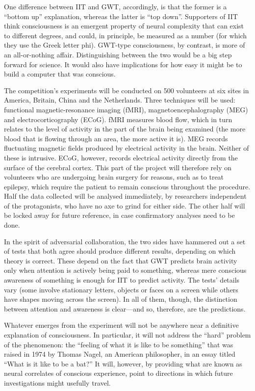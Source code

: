 \documentclass[
]{book}
\begin{document}
One difference between IIT and GWT, accordingly, is that the former is a ``bottom up'' explanation, whereas the latter is ``top down''. Supporters of IIT think consciousness is an emergent property of neural complexity that can exist to different degrees, and could, in principle, be measured as a number (for which they use the Greek letter phi). GWT-type consciousness, by contrast, is more of an all-or-nothing affair. Distinguishing between the two would be a big step forward for science. It would also have implications for how easy it might be to build a computer that was conscious.

The competition's experiments will be conducted on 500 volunteers at six sites in America, Britain, China and the Netherlands. Three techniques will be used: functional magnetic-resonance imaging (fMRI), magnetoencephalography (MEG) and electrocorticography (ECoG). fMRI measures blood flow, which in turn relates to the level of activity in the part of the brain being examined (the more blood that is flowing through an area, the more active it is). MEG records fluctuating magnetic fields produced by electrical activity in the brain. Neither of these is intrusive. ECoG, however, records electrical activity directly from the surface of the cerebral cortex. This part of the project will therefore rely on volunteers who are undergoing brain surgery for reasons, such as to treat epilepsy, which require the patient to remain conscious throughout the procedure. Half the data collected will be analysed immediately, by researchers independent of the protagonists, who have no axe to grind for either side. The other half will be locked away for future reference, in case confirmatory analyses need to be done.

In the spirit of adversarial collaboration, the two sides have hammered out a set of tests that both agree should produce different results, depending on which theory is correct. These depend on the fact that GWT predicts brain activity only when attention is actively being paid to something, whereas mere conscious awareness of something is enough for IIT to predict activity. The tests' details vary (some involve stationary letters, objects or faces on a screen while others have shapes moving across the screen). In all of them, though, the distinction between attention and awareness is clear---and so, therefore, are the predictions.

Whatever emerges from the experiment will not be anywhere near a definitive explanation of consciousness. In particular, it will not address the ``hard'' problem of the phenomenon: the ``feeling of what it is like to be something'' that was raised in 1974 by Thomas Nagel, an American philosopher, in an essay titled ``What is it like to be a bat?'' It will, however, by providing what are known as neural correlates of conscious experience, point to directions in which future investigations might usefully travel.
\end{document}
